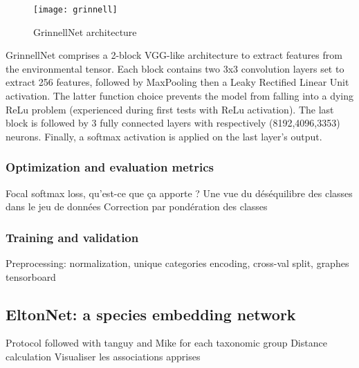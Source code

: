 \documentclass[]{article}
\begin{document}
\begin{figure}[h]
	\centering
	\texttt{[image: grinnell]}
	\caption{GrinnellNet architecture}
	\label{grinnarchi}
\end{figure}


\noindent GrinnellNet comprises a 2-block VGG-like architecture\cite{simonyan2014very} to extract features from the environmental tensor. Each block contains two 3x3 convolution layers set to extract 256 features, followed by MaxPooling then a Leaky Rectified Linear Unit activation. The latter function choice prevents the model from falling into a dying ReLu problem (experienced during first tests with ReLu activation)\cite{maas2013rectifier}. The last block is followed by 3 fully connected layers with  respectively (8192,4096,3353) neurons. Finally, a softmax activation is applied on the last layer's output.

\subsubsection{Optimization and evaluation metrics}
Focal softmax loss, qu'est-ce que ça apporte ?
Une vue du déséquilibre des classes dans le jeu de données
Correction par pondération des classes

\subsubsection{Training and validation}
Preprocessing: normalization, unique categories encoding, cross-val split, graphes tensorboard

\subsection{EltonNet: a species embedding network}
Protocol followed with tanguy and Mike for each taxonomic group
Distance calculation
Visualiser les associations apprises


	
\end{document}
